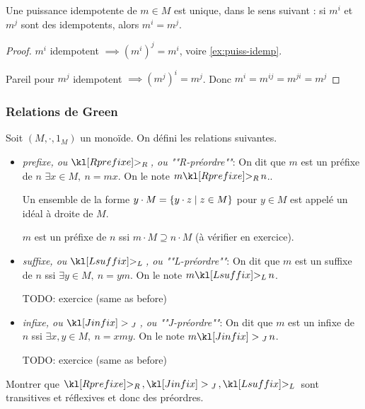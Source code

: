 \begin{lemma}\label{lem:puiss-idemp}
	Une puissance idempotente de $m \in M$ est unique, dans le sens suivant : si $m^i$ et $m^j$ sont des idempotents, alors $m^i = m^j$.
\end{lemma}

\begin{proof}
	$m^i$ idempotent $\implies (m^i)^j = m^i$, voire \ref{ex:puiss-idemp}.

	Pareil pour $m^j$ idempotent $\implies (m^j)^i = m^j$.
	Donc $m^i = m^{ij} = m^{ji} = m^{j}$
\end{proof}

\subsubsection{Relations de Green}

\begin{definition}
	Soit $(M,\cdot , 1_M)$ un monoïde. On défini les relations suivantes.

	\begin{itemize}
		\item \emph{prefixe, ou $\geqr$, ou ""R-préordre""}: On dit que $m$ est un préfixe de $n$ \ssi $\exists x \in M, \ n = mx$.
		      On le note $m \geqr n$..

		      Un ensemble de la forme $y \cdot M = \left\{y \cdot z \mid z \in M\right\}$ pour $y \in M$ est appelé un idéal à droite de $M$.

		      $m$ est un préfixe de $n$ ssi $m \cdot M \supseteq n \cdot M$ (à vérifier en exercice).


		\item \emph{suffixe, ou $\geql$, ou ""L-préordre""}: On dit que $m$ est un suffixe de $n$ ssi $\exists y \in M, \ n = ym$.
		      On le note $m \geql n$.

		      TODO: exercice (same as before)


		\item \emph{infixe, ou $\geqj$, ou ""J-préordre""}: On dit que $m$ est un infixe de $n$ ssi $\exists x,y \in M, \ n = xmy$.
		      On le note $m \geqj n$.

		      TODO: exercice (same as before)
	\end{itemize}
\end{definition}

\begin{exercice}
	Montrer que $\geqr,\geqj,\geql$  sont transitives et réflexives et donc des préordres.
\end{exercice}

